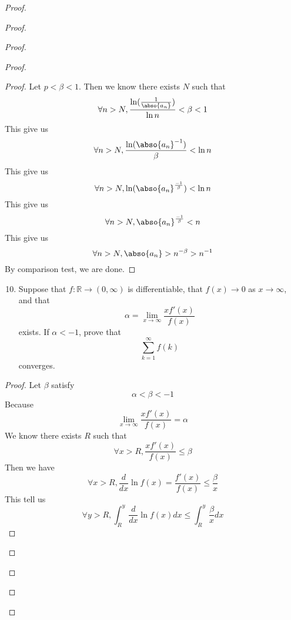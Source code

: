 \documentclass{report}
\begin{document}
\begin{proof}
\begin{proof}
\begin{proof}
\begin{proof}
\begin{proof}
Let $p<\beta <1$. Then we know there exists $N$ such that
\begin{equation*}
\forall n>N, \frac{\ln (\frac{1}{\abso{a_n}})}{\ln n}<\beta <1
\end{equation*}
This give us
\begin{equation*}
  \forall n>N, \frac{\ln(\abso{a_n}^{-1})}{\beta }<\ln n
\end{equation*}
This give us
\begin{equation*}
\forall n>N, \ln(\abso{a_n}^{\frac{-1}{\beta }})<\ln n 
\end{equation*}
This give us
\begin{equation*}
\forall n>N, \abso{a_n}^{\frac{-1}{\beta }}<n
\end{equation*}
This give us
\begin{equation*}
\forall n>N, \abso{a_n}>n^{-\beta }>n^{-1}
\end{equation*}
By comparison test, we are done.
\end{proof}
\begin{question}{}{}
\begin{enumerate}
    \setcounter{enumi}{9}
    \item Suppose that \( f : \mathbb{R} \to (0,\infty) \) is differentiable, that \( f(x) \to 0 \) as \( x \to \infty \), and that
    \[
    \alpha = \lim_{{x \to \infty}} \frac{xf'(x)}{f(x)}
    \]
    exists. If \( \alpha < -1 \), prove that
    \[
    \sum_{k=1}^{\infty} f(k)
    \]
    converges.
\end{enumerate}
\end{question}
\begin{proof}
Let $\beta $ satisfy
\begin{equation*}
\alpha<\beta <-1 
\end{equation*}
Because
\begin{equation*}
\lim_{x\to\infty}\frac{xf'(x)}{f(x)}=\alpha 
\end{equation*}
We know there exists $R$ such that
\begin{equation*}
\forall x>R, \frac{xf'(x)}{f(x)}\leq \beta 
\end{equation*}
Then we have
\begin{equation*}
\forall x>R, \frac{d}{dx}\ln f(x)=\frac{f'(x)}{f(x)}\leq \frac{\beta }{x}
\end{equation*}
This tell us 
\begin{equation*}
  \forall y>R, \int^y_R \frac{d}{dx}\ln f(x)dx\leq \int^y_R \frac{\beta}{x}dx
\end{equation*}

\end{proof}
\end{proof}
\end{proof}
\end{proof}
\end{proof}
\end{document}
